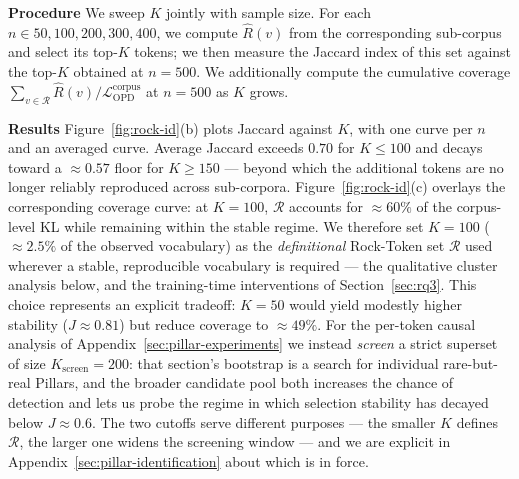 \documentclass{article}
\begin{document}
\textbf{Procedure} We sweep $K$ jointly with sample size. For each $n \in {50, 100, 200, 300, 400}$, we compute $\widehat R(v)$ from the corresponding sub-corpus and select its top-$K$ tokens; we then measure the Jaccard index of this set against the top-$K$ obtained at $n = 500$. We additionally compute the cumulative coverage $\sum_{v \in \mathcal{R}} \widehat R(v) / \mathcal{L}_{\text{OPD}}^{\text{corpus}}$ at $n = 500$ as $K$ grows.


\textbf{Results} Figure~\ref{fig:rock-id}(b) plots Jaccard against $K$, with one curve per $n$ and an averaged curve. Average Jaccard exceeds $0.70$ for $K \leq 100$ and decays toward a $\approx 0.57$ floor for $K \geq 150$ — beyond which the additional tokens are no longer reliably reproduced across sub-corpora. Figure~\ref{fig:rock-id}(c) overlays the corresponding coverage curve: at $K = 100$, $\mathcal{R}$ accounts for $\approx 60\%$ of the corpus-level KL while remaining within the stable regime. We therefore set $K = 100$ ($\approx 2.5\%$ of the observed vocabulary) as the \emph{definitional} Rock-Token set $\mathcal{R}$ used wherever a stable, reproducible vocabulary is required --- the qualitative cluster analysis below, and the training-time interventions of Section~\ref{sec:rq3}. This choice represents an explicit tradeoff: $K = 50$ would yield modestly higher stability ($J \approx 0.81$) but reduce coverage to $\approx 49\%$. For the per-token causal analysis of Appendix~\ref{sec:pillar-experiments} we instead \emph{screen} a strict superset of size $K_{\text{screen}}=200$: that section's bootstrap is a search for individual rare-but-real Pillars, and the broader candidate pool both increases the chance of detection and lets us probe the regime in which selection stability has decayed below $J\!\approx\!0.6$. The two cutoffs serve different purposes --- the smaller $K$ defines $\mathcal{R}$, the larger one widens the screening window --- and we are explicit in Appendix~\ref{sec:pillar-identification} about which is in force.





\newpage

\end{document}

